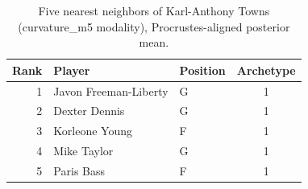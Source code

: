 \begin{table}[htbp]
  \centering\small
  \begin{tabular}{rllc}
    \toprule
    Rank & Player & Position & Archetype \\
    \midrule
    1 & Javon Freeman-Liberty & G & 1 \\
    2 & Dexter Dennis & G & 1 \\
    3 & Korleone Young & F & 1 \\
    4 & Mike Taylor & G & 1 \\
    5 & Paris Bass & F & 1 \\
    \bottomrule
  \end{tabular}
  \caption{Five nearest neighbors of Karl-Anthony Towns (curvature_m5 modality), Procrustes-aligned posterior mean.}
  \label{tab:Karl_Anthony_Towns_neighbors_curvature_m5}
\end{table}

